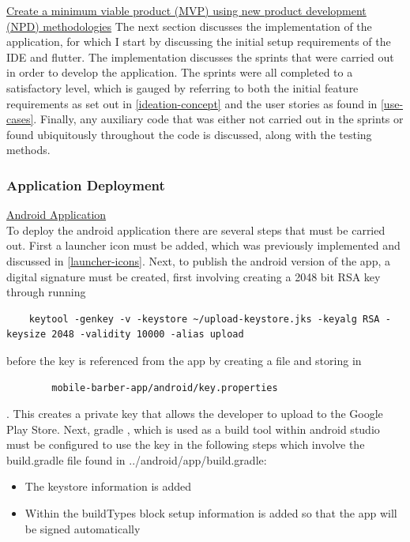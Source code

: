 \documentclass[12pt]{article}
\begin{document}
	\noindent
	\underline{Create a minimum viable product (MVP) using new product development}
	\\
	\underline{(NPD) methodologies} 
	\newline
	The next section discusses the implementation of the application, for which I start by discussing the initial setup requirements of the IDE and flutter. The implementation discusses the sprints that were carried out in order to develop the application. The sprints were all completed to a satisfactory level, which is gauged by referring to both the initial feature requirements as set out in \autoref{ideation-concept} and the user stories as found in \autoref{use-cases}. Finally, any auxiliary code that was either not carried out in the sprints or found ubiquitously throughout the code is discussed, along with the testing methods.
	
	\subsubsection{Application Deployment}
	\underline{Android Application}
	\\
	To deploy the android application there are several steps that must be carried out. First a launcher icon must be added, which was previously implemented and discussed in \autoref{launcher-icons}. Next, to publish the android version of the app, a digital signature must be created, first involving creating a 2048 bit RSA key through running 
	\begin{lstlisting}
	keytool -genkey -v -keystore ~/upload-keystore.jks -keyalg RSA -keysize 2048 -validity 10000 -alias upload
	\end{lstlisting}
	before the key is referenced from the app by creating a file and storing in 
	\begin{lstlisting}
		mobile-barber-app/android/key.properties
	\end{lstlisting}.
	This creates a private key that allows the developer to upload to the Google Play Store.
	Next, gradle \cite{androidAndroidGradlePlugin2021}, which is used as a build tool within android studio must be configured to use the key in the following steps which involve the build.gradle file found in ../android/app/build.gradle: 
	\begin{itemize}
		\item The keystore information is added
		\item Within the buildTypes block setup information is added so that the app will be signed automatically
	\end{itemize}
\end{document}
